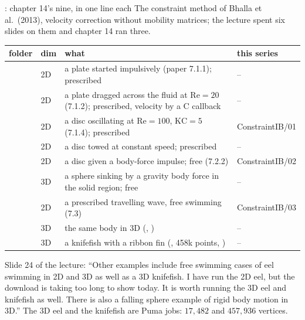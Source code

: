\documentclass[aspectratio=169,11pt]{beamer}
\begin{document}
\begin{frame}{: chapter 14's nine, in one line each}
\label{fr:constraintib}
\footnotesize The constraint method of Bhalla et al.\ (2013), velocity correction without mobility matrices; the lecture spent six slides on them and chapter 14 ran three.
\begin{center}
\scriptsize
\setlength{\tabcolsep}{3pt}
\begin{tabular}{@{}llL{0.5\textwidth}l@{}}
\toprule
folder & dim & what & this series\\
\midrule
{} & 2D & a plate started impulsively (paper 7.1.1); prescribed & --\\
 & 2D & a plate dragged across the fluid at $\mathrm{Re} = 20$ (7.1.2); prescribed, velocity by a C callback & --\\
 & 2D & a disc oscillating at $\mathrm{Re} = 100$, $\mathrm{KC} = 5$ (7.1.4); prescribed & ConstraintIB/01\\
 & 2D & a disc towed at constant speed; prescribed & --\\
 & 2D & a disc given a body-force impulse; free (7.2.2) & ConstraintIB/02\\
 & 3D & a sphere sinking by a gravity body force in the solid region; free & --\\
 & 2D & a prescribed travelling wave, free swimming (7.3) & ConstraintIB/03\\
 & 3D & the same body in 3D (, ) & --\\
 & 3D & a knifefish with a ribbon fin (, 458k points, ) & --\\
\bottomrule
\end{tabular}
\end{center}
\scriptsize Slide 24 of the lecture: ``Other examples include free swimming cases of eel swimming in 2D and 3D as well as a 3D knifefish. I have run the 2D eel, but the download is taking too long to show today. It is worth running the 3D eel and knifefish as well. There is also a falling sphere example of rigid body motion in 3D.'' The 3D eel and the knifefish are Puma jobs: $17{,}482$ and $457{,}936$ vertices.
\end{frame}
\end{document}
